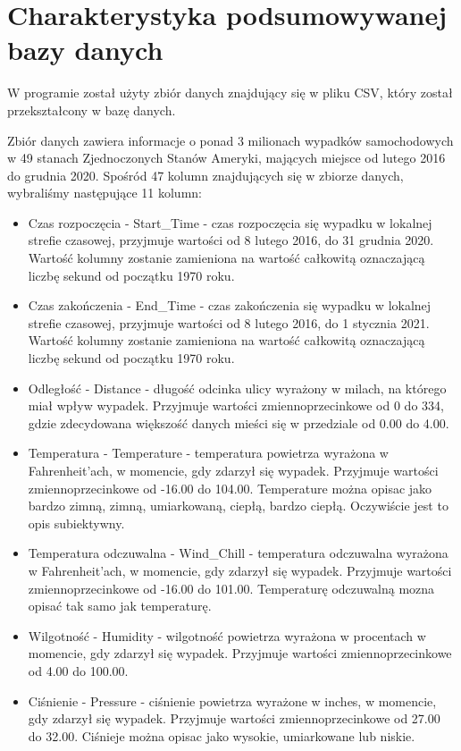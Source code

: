 \documentclass{classrep}
\begin{document}
\section{Charakterystyka podsumowywanej bazy danych}
W programie został użyty zbiór danych \cite{dane} znajdujący się w pliku CSV, który został przekształcony w bazę danych. 

Zbiór danych zawiera informacje o ponad 3 milionach wypadków samochodowych w 49 stanach Zjednoczonych Stanów Ameryki, mających miejsce od lutego 2016 do grudnia 2020. Spośród 47 kolumn znajdujących się w zbiorze danych, wybraliśmy następujące 11 kolumn:
\begin{itemize}
\item Czas rozpoczęcia - Start\_Time - czas rozpoczęcia się wypadku w lokalnej strefie czasowej, przyjmuje wartości od 8 lutego 2016, do 31 grudnia 2020. Wartość kolumny zostanie zamieniona na wartość całkowitą oznaczającą liczbę sekund od początku 1970 roku.
\item Czas zakończenia - End\_Time - czas zakończenia się wypadku w lokalnej strefie czasowej, przyjmuje wartości od 8 lutego 2016, do 1 stycznia 2021. Wartość kolumny zostanie zamieniona na wartość całkowitą oznaczającą liczbę sekund od początku 1970 roku. 
\item Odległość - Distance - długość odcinka ulicy wyrażony w milach, na którego miał wpływ wypadek. Przyjmuje wartości zmiennoprzecinkowe od 0 do 334, gdzie zdecydowana większość danych mieści się w przedziale od 0.00 do 4.00. 
\item Temperatura - Temperature - temperatura powietrza wyrażona w Fahrenheit'ach, w momencie, gdy zdarzył się wypadek.  Przyjmuje wartości zmiennoprzecinkowe od -16.00 do 104.00.  Temperature można opisac jako bardzo zimną, zimną, umiarkowaną, ciepłą, bardzo ciepłą. Oczywiście jest to opis subiektywny.
\item Temperatura odczuwalna - Wind\_Chill - temperatura odczuwalna wyrażona w Fahrenheit'ach, w momencie, gdy zdarzył się wypadek.  Przyjmuje wartości zmiennoprzecinkowe od -16.00 do 101.00. Temperaturę odczuwalną mozna opisać tak samo jak temperaturę.
\item Wilgotność - Humidity - wilgotność powietrza wyrażona w procentach w momencie, gdy zdarzył się wypadek. Przyjmuje wartości zmiennoprzecinkowe od 4.00 do 100.00. 
\item Ciśnienie - Pressure - ciśnienie powietrza wyrażone w inches, w momencie, gdy zdarzył się wypadek. Przyjmuje wartości zmiennoprzecinkowe od 27.00 do 32.00. Ciśnieje można opisac jako wysokie, umiarkowane lub niskie. 

\end{itemize}
\end{document}
